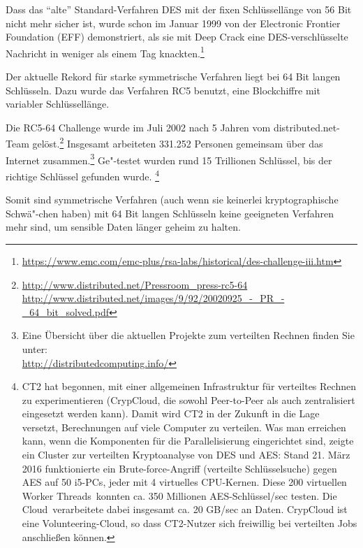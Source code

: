 \begin{refsegment}
Dass das "`alte"' Standard-Verfahren DES mit der fixen Schlüssellänge
von 56 Bit nicht mehr sicher ist, wurde schon im Januar 1999 von der
Electronic Frontier Foundation (EFF) demonstriert, als sie mit Deep Crack
eine DES-verschlüsselte Nachricht in weniger als einem Tag
knackten.\footnote{%
  \url{https://www.emc.com/emc-plus/rsa-labs/historical/des-challenge-iii.htm}
}

Der aktuelle Rekord für starke symmetrische Verfahren liegt bei 64 Bit
langen Schlüsseln. Dazu wurde das Verfahren RC5 benutzt, eine
Blockchiffre mit variabler Schlüssellänge.

Die RC5-64 Challenge wurde im Juli 2002 nach 5 Jahren vom
distributed.net-Team gelöst.\footnote{%
 \url{http://www.distributed.net/Pressroom_press-rc5-64}\\
 \url{http://www.distributed.net/images/9/92/20020925_-_PR_-_64_bit_solved.pdf}
}
Insgesamt arbeiteten 331.252 Personen gemeinsam über das Internet
zusammen.\footnote{%
Eine Übersicht über die aktuellen Projekte zum verteilten Rechnen finden
Sie unter:\\
\url{http://distributedcomputing.info/}
}
Ge"-testet wurden rund 15 Trillionen Schlüssel, bis der
richtige Schlüssel gefunden wurde.%
\footnote{%
  CT2 hat begonnen, mit einer allgemeinen Infrastruktur für verteiltes
  Rechnen zu experimentieren (CrypCloud, die sowohl Peer-to-Peer
  als auch zentralisiert eingesetzt werden kann). Damit wird CT2 in der Zukunft in die
  Lage versetzt, Berechnungen auf viele Computer zu verteilen.
  Was man erreichen kann, wenn die Komponenten für die Parallelisierung eingerichtet
  sind, zeigte ein Cluster zur verteilten Kryptoanalyse von DES und AES:
  Stand 21. März 2016 funktionierte ein Brute-force-Angriff (verteilte Schlüsselsuche)
  gegen AES auf 50 i5-PCs, jeder mit 4 virtuelles CPU-Kernen. Diese 200 virtuellen
  \glqq Worker Threads\grqq~konnten ca. 350 Millionen AES-Schlüssel/sec testen. Die
  \glqq Cloud\grqq~verarbeitete dabei insgesamt ca. 20 GB/sec an Daten. CrypCloud
  ist eine Volunteering-Cloud, so dass CT2-Nutzer sich freiwillig bei
  verteilten Jobs anschließen können.
}


Somit sind symmetrische Verfahren (auch wenn sie keinerlei
kryptographische Schwä"-chen haben) mit 64 Bit langen Schlüsseln
keine geeigneten Verfahren mehr sind, um sensible Daten länger geheim
zu halten.





\end{refsegment}
